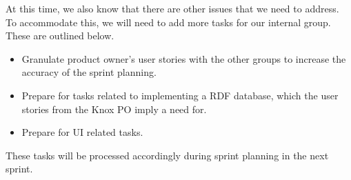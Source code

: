At this time, we also know that there are other issues that we need to address. To accommodate this, we will need to add more tasks for our internal group. These are outlined below.

\begin{itemize}
    \item Granulate product owner's user stories with the other \knox{} groups to increase the accuracy of the sprint planning.
    \item Prepare for tasks related to implementing a RDF database, which the user stories from the Knox PO imply a need for.
    \item Prepare for UI related tasks.
\end{itemize}

These tasks will be processed accordingly during sprint planning in the next sprint.